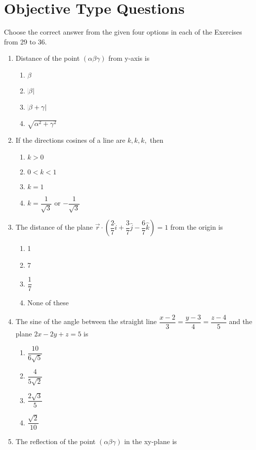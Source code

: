 \documentclass[12pt]{article}
\providecommand{\brak}[1]{\ensuremath{\left(#1\right)}}
\begin{document}
\section*{Objective Type Questions}
Choose the correct answer from the given four options in each of the Exercises from 29 to 36.
\begin{enumerate}[resume]
\item Distance of the point $(\alpha \beta \gamma)$ from y-axis is
\begin{enumerate}[fourcol]
	\item $\beta$ 
	\item $\abs{\beta}$
	\item $\abs{\beta+\gamma}$
	\item $\sqrt{\alpha^2+\gamma^2}$
\end{enumerate}
\item If the directions cosines of a line are $k,k,k,$ then
\begin{enumerate}[fourcol]
	\item $k>0$
	\item $0<k<1$
	\item $k=1$ 
	\item $k=\dfrac{1}{\sqrt{3}}$ or $-\dfrac{1}{\sqrt{3}}$
\end{enumerate}
\item The distance of the plane $\overrightarrow{r} \cdot \brak{ \dfrac{2}{7}\hat{i}+\dfrac{3}{7}\hat{j}-\dfrac{6}{7}\hat{k}}=1$ from the origin is 
\begin{enumerate}[fourcol]
	\item 1
	\item 7
	\item $\dfrac{1}{7}$
	\item None of these	
\end{enumerate}
\item The sine of the angle between the straight line $\dfrac{x-2}{3}=\dfrac{y-3}{4}=\dfrac{z-4}{5}$ and the plane $2x-2y+z=5$ is
\begin{enumerate}[fourcol]
	\item $\dfrac{10}{6\sqrt{5}}$ 
	\item $\dfrac{4}{5\sqrt{2}}$
	\item $\dfrac{2\sqrt{3}}{5}$
	\item $\dfrac{\sqrt{2}}{10}$
\end{enumerate}
\item The reflection of the point $(\alpha \beta \gamma )$ in the xy-plane is 
\begin{enumerate}[fourcol]

\end{enumerate}
\end{enumerate}
\end{document}
